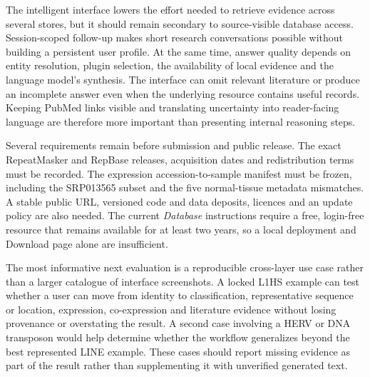 The intelligent interface lowers the effort needed to retrieve evidence across several stores, but it should remain secondary to source-visible database access. Session-scoped follow-up makes short research conversations possible without building a persistent user profile. At the same time, answer quality depends on entity resolution, plugin selection, the availability of local evidence and the language model's synthesis. The interface can omit relevant literature or produce an incomplete answer even when the underlying resource contains useful records. Keeping PubMed links visible and translating uncertainty into reader-facing language are therefore more important than presenting internal reasoning steps.

Several requirements remain before submission and public release. The exact RepeatMasker and RepBase releases, acquisition dates and redistribution terms must be recorded. The expression accession-to-sample manifest must be frozen, including the SRP013565 subset and the five normal-tissue metadata mismatches. A stable public URL, versioned code and data deposits, licences and an update policy are also needed. The current \emph{Database} instructions require a free, login-free resource that remains available for at least two years, so a local deployment and Download page alone are insufficient.

The most informative next evaluation is a reproducible cross-layer use case rather than a larger catalogue of interface screenshots. A locked L1HS example can test whether a user can move from identity to classification, representative sequence or location, expression, co-expression and literature evidence without losing provenance or overstating the result. A second case involving a HERV or DNA transposon would help determine whether the workflow generalizes beyond the best represented LINE example. These cases should report missing evidence as part of the result rather than supplementing it with unverified generated text.
